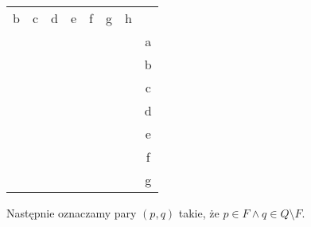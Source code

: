 \documentclass{article}
\begin{document}
    \begin{table}[h!]
        \begin{tabular}{cccccccc}
        b                      & c                     & d                     & e                     & f                     & g                     & h                     &   \\ \cline{1-7}
        \multicolumn{1}{|c|}{} & \multicolumn{1}{c|}{} & \multicolumn{1}{c|}{} & \multicolumn{1}{c|}{} & \multicolumn{1}{c|}{} & \multicolumn{1}{c|}{} & \multicolumn{1}{c|}{} & a \\ \cline{1-7}
        \multicolumn{1}{c|}{}  & \multicolumn{1}{c|}{} & \multicolumn{1}{c|}{} & \multicolumn{1}{c|}{} & \multicolumn{1}{c|}{} & \multicolumn{1}{c|}{} & \multicolumn{1}{c|}{} & b \\ \cline{2-7}
                               & \multicolumn{1}{c|}{} & \multicolumn{1}{c|}{} & \multicolumn{1}{c|}{} & \multicolumn{1}{c|}{} & \multicolumn{1}{c|}{} & \multicolumn{1}{c|}{} & c \\ \cline{3-7}
                               &                       & \multicolumn{1}{c|}{} & \multicolumn{1}{c|}{} & \multicolumn{1}{c|}{} & \multicolumn{1}{c|}{} & \multicolumn{1}{c|}{} & d \\ \cline{4-7}
                               &                       &                       & \multicolumn{1}{c|}{} & \multicolumn{1}{c|}{} & \multicolumn{1}{c|}{} & \multicolumn{1}{c|}{} & e \\ \cline{5-7}
                               &                       &                       &                       & \multicolumn{1}{c|}{} & \multicolumn{1}{c|}{} & \multicolumn{1}{c|}{} & f \\ \cline{6-7}
                               &                       &                       &                       &                       & \multicolumn{1}{c|}{} & \multicolumn{1}{c|}{} & g \\ \cline{7-7}
        \end{tabular}
    \end{table}

    Następnie oznaczamy pary $(p, q)$ takie, że $p \in F \wedge q \in Q \setminus F$.
\end{document}
